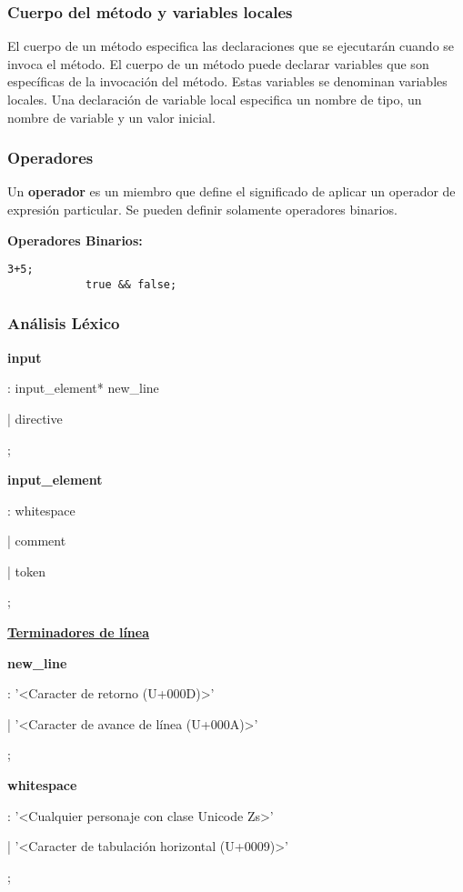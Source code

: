 	\subsubsection{Cuerpo del método y variables locales}
		El cuerpo de un método especifica las declaraciones que se ejecutarán cuando se invoca el método. El cuerpo de un método puede declarar variables que son específicas de la invocación del método. Estas variables se denominan variables locales. Una declaración de variable local especifica un nombre de tipo, un nombre de variable y un valor inicial.
		
	\subsubsection{Operadores}
		Un \textbf{operador} es un miembro que define el significado de aplicar un operador de expresión particular. Se pueden definir solamente operadores binarios.\par
		
		\textbf{Operadores Binarios:}
		\begin{lstlisting}[language={PySharp}]
			3+5;
			true && false;
		\end{lstlisting}
    
	\subsubsection{Análisis Léxico}
		\textbf{input}\par
		: input\_element* new\_line\par
		| directive\par
		;\par
		
		\textbf{input\_element}\par
		: whitespace\par
		| comment\par
		| token\par
		;\par
		
		\underline{\textbf{Terminadores de línea}}\par
		\textbf{new\_line}\par
		: '<Caracter de retorno (U+000D)>'\par
		| '<Caracter de avance de línea (U+000A)>'\par
		;\par
		
		\textbf{whitespace}\par
		: '<Cualquier personaje con clase Unicode Zs>'\par
		| '<Caracter de tabulación horizontal (U+0009)>'\par
		;\par
		
